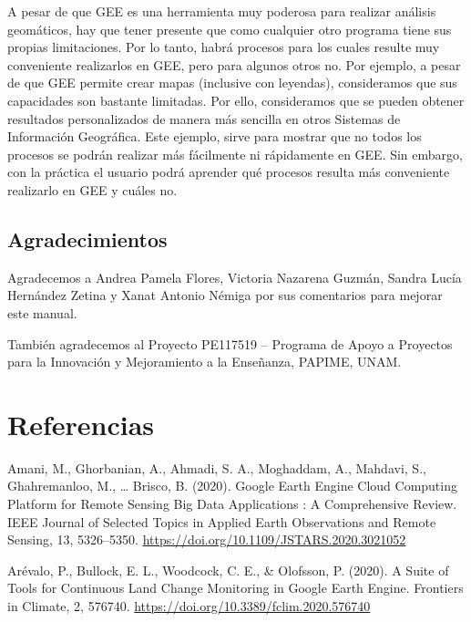 \documentclass[
  12pt,
  letterpaper,
  twoside]{book}
\begin{document}
A pesar de que GEE es una herramienta muy poderosa para realizar análisis geomáticos, hay que tener presente que como cualquier otro programa tiene sus propias limitaciones. Por lo tanto, habrá procesos para los cuales resulte muy conveniente realizarlos en GEE, pero para algunos otros no. Por ejemplo, a pesar de que GEE permite crear mapas (inclusive con leyendas), consideramos que sus capacidades son bastante limitadas. Por ello, consideramos que se pueden obtener resultados personalizados de manera más sencilla en otros Sistemas de Información Geográfica. Este ejemplo, sirve para mostrar que no todos los procesos se podrán realizar más fácilmente ni rápidamente en GEE. Sin embargo, con la práctica el usuario podrá aprender qué procesos resulta más conveniente realizarlo en GEE y cuáles no.

\newpage

\hypertarget{agradecimientos}{%
\section*{Agradecimientos}\label{agradecimientos}}

Agradecemos a Andrea Pamela Flores, Victoria Nazarena Guzmán, Sandra Lucía Hernández Zetina y Xanat Antonio Némiga por sus comentarios para mejorar este manual.

También agradecemos al Proyecto PE117519 -- Programa de Apoyo a Proyectos para la Innovación y Mejoramiento a la Enseñanza, PAPIME, UNAM.

\newpage
\backmatter

\hypertarget{referencias}{%
\chapter{Referencias}\label{referencias}}

Amani, M., Ghorbanian, A., Ahmadi, S. A., Moghaddam, A., Mahdavi, S., Ghahremanloo, M., \ldots{} Brisco, B. (2020). Google Earth Engine Cloud Computing Platform for Remote Sensing Big Data Applications : A Comprehensive Review. IEEE Journal of Selected Topics in Applied Earth Observations and Remote Sensing, 13, 5326--5350. \url{https://doi.org/10.1109/JSTARS.2020.3021052}

Arévalo, P., Bullock, E. L., Woodcock, C. E., \& Olofsson, P. (2020). A Suite of Tools for Continuous Land Change Monitoring in Google Earth Engine. Frontiers in Climate, 2, 576740. \url{https://doi.org/10.3389/fclim.2020.576740}
\end{document}
